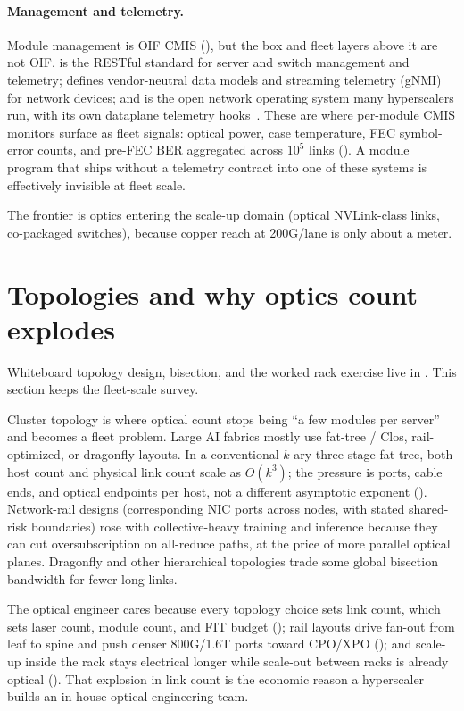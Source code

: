 \paragraph{Management and telemetry.} Module management is OIF CMIS
(), but the box and fleet layers above it are not OIF.
 is the RESTful standard for server and switch management and
telemetry;  defines vendor-neutral data models and streaming
telemetry (gNMI) for network devices; and  is the open network
operating system many hyperscalers run, with its own dataplane telemetry
hooks~. These are where per-module CMIS monitors surface as
fleet signals: optical power, case temperature, FEC symbol-error counts, and
pre-FEC BER aggregated across $10^5$ links ().
A module program that ships without a telemetry contract into one of these systems
is effectively invisible at fleet scale.

The frontier is optics entering the scale-up domain (optical NVLink-class links,
co-packaged switches), because copper reach at 200G/lane is only about a meter.

\section{Topologies and why optics count explodes}
\label{sec:topologies}

Whiteboard topology design, bisection, and the worked rack exercise live in
. This section keeps the fleet-scale survey.

Cluster topology is where optical count stops being ``a few modules per server''
and becomes a fleet problem. Large AI fabrics mostly use fat-tree / Clos,
rail-optimized, or dragonfly layouts. In a conventional $k$-ary three-stage fat
tree, both host count and physical link count scale as $O(k^3)$; the pressure
is ports, cable ends, and optical endpoints per host, not a different
asymptotic exponent (). Network-rail designs
(corresponding NIC ports across nodes, with stated shared-risk boundaries) rose
with collective-heavy training and inference because they can cut
oversubscription on all-reduce paths, at the price of more parallel optical
planes. Dragonfly and other hierarchical topologies trade some global bisection
bandwidth for fewer long links.

The optical engineer cares because every topology choice sets link count, which
sets laser count, module count, and FIT budget (); rail
layouts drive fan-out from leaf to spine and push denser 800G/1.6T ports toward
CPO/XPO (); and scale-up inside the rack stays
electrical longer while scale-out between racks is already optical
(). That explosion in link count is the economic reason a
hyperscaler builds an in-house optical engineering team.

